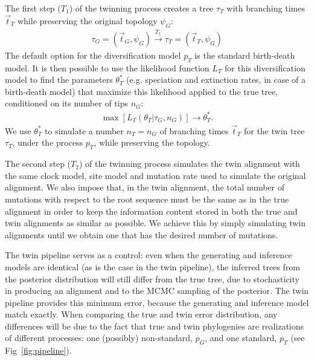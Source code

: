The first step ($T_1$) of the twinning process creates a tree $\tau_{\mathit{T}}$
with branching times $\Vec{t}_{\mathit{T}}$ while preserving the original
topology $\psi_{\mathit{G}}$:
\begin{align}
  \tau_{\mathit{G}} = (\Vec{t}_{\mathit{G}}, \psi_{\mathit{G}}) 
  \xrightarrow[]{\mathit{T_1}} 
  \tau_{\mathit{T}} = (\Vec{t}_{\mathit{T}}, \psi_{\mathit{G}})
\end{align}
The default option for the diversification model $p_T$ is the standard birth-death model.
It is then possible to use the likelihood function 
$L_{\mathit{T}}$ for this diversification model to find the parameters $\theta^{*}_{\mathit{T}}$ 
(e.g. speciation and extinction rates, in case of a birth-death model) 
that maximize this likelihood applied 
to the true tree, conditioned on its number of tips $n_{\mathit{G}}$:
\begin{align}
    \max[L_{\mathit{T}}(\theta_{\mathit{T}}|\tau_{\mathit{G}}, n_{\mathit{G}})] 
\rightarrow \theta^{*}_{\mathit{T}}.
\end{align}
We use $\theta^{*}_{\mathit{T}}$ to simulate a number 
$n_{\mathit{T}} = n_{\mathit{G}}$ 
of branching times $\Vec{t}_{\mathit{T}}$ for the twin tree 
$\tau_{\mathit{T}}$, under the process $p_{T}$, 
while preserving the topology.

The second step ($T_2$) of the twinning process simulates the twin alignment with the same clock model, site model and mutation rate 
used to simulate the original alignment. 
We also impose that, in the twin alignment, 
the total number of mutations with respect to the root sequence 
must be the same as in the true alignment in order to keep the information content 
stored in both the true and twin alignments as similar as possible. We achieve this by simply simulating twin alignments until we
obtain one that has the desired number of mutations.

The twin pipeline serves as a control: 
even when the generating and inference models are identical
(as is the case in the twin pipeline),
the inferred trees from the posterior distribution will 
still differ from the true tree, 
due to stochasticity in producing an alignment 
and to the MCMC sampling of the posterior.
The twin pipeline provides this minimum error,
because the generating and inference model match exactly.
When comparing the true and twin error distribution,
any differences will be due to the fact that true and twin phylogenies are realizations 
of different processes: one (possibly) non-standard, $p_G$, 
and one standard, $p_T$ (see Fig~\ref{fig:pipeline}).

